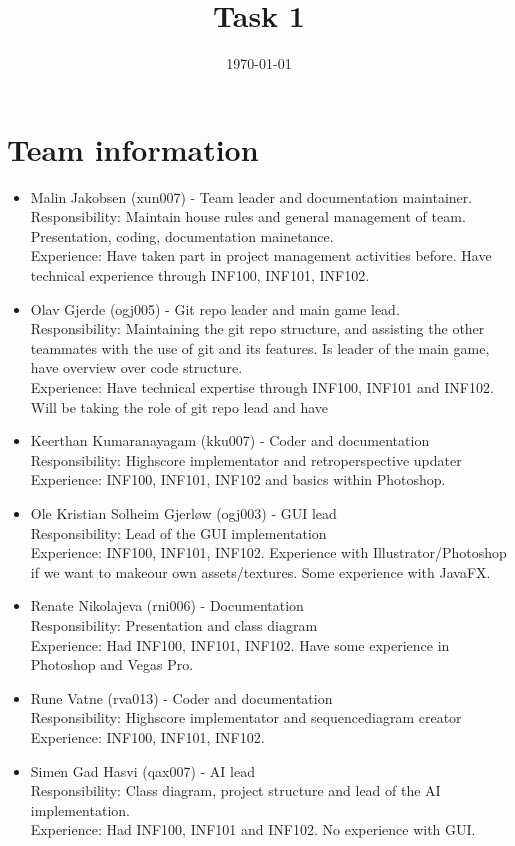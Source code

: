 \documentclass[12pt]{article}%
\begin{document}
\title{Task 1}
\date{\today}
\maketitle
\section{Team information}




\begin{itemize}
\item Malin Jakobsen (xun007) - Team leader and documentation maintainer. \\
Responsibility: Maintain house rules and general management of team. Presentation, coding, documentation mainetance. \\
	Experience: Have taken part in project management activities before. Have technical
experience through INF100, INF101, INF102. 

\item Olav Gjerde (ogj005) - Git repo leader and main game lead. \\
Responsibility: Maintaining the git repo structure, and assisting the other teammates 
with the use of git and its features. Is leader of the main game, have overview over code structure. \\
Experience: Have technical expertise through INF100, INF101 and INF102. Will be
taking the role of git repo lead and have 
\item Keerthan Kumaranayagam (kku007) -  Coder and documentation\\
Responsibility: Highscore implementator and retroperspective updater\\
Experience: INF100, INF101, INF102 and basics within Photoshop.
\item Ole Kristian Solheim Gjerløw (ogj003) - GUI lead\\
Responsibility: Lead of the GUI implementation\\
Experience: INF100, INF101, INF102. Experience with Illustrator/Photoshop if we want to makeour own assets/textures. Some experience with JavaFX.
\item Renate Nikolajeva (rni006) - Documentation\\
Responsibility: Presentation and class diagram\\
	Experience: Had INF100, INF101, INF102. Have some experience in Photoshop and
Vegas Pro. 

\item Rune Vatne  (rva013) - Coder and documentation\\
Responsibility: Highscore implementator and sequencediagram creator \\
	Experience: INF100, INF101, INF102. 
\item Simen Gad Hasvi  (qax007) - AI lead\\
Responsibility: Class diagram, project structure and lead of the AI implementation.\\
	Experience: Had INF100, INF101 and INF102. No experience with GUI.
\end{itemize}
        
\end{document}
